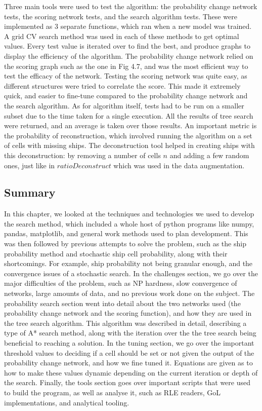 \documentclass{l4proj}
\begin{document}
Three main tools were used to test the algorithm: the probability change network tests, the scoring network tests, and the search algorithm tests. These were implemented as 3 separate functions, which ran when a new model was trained. A grid CV search method was used in each of these methods to get optimal values. Every test value is iterated over to find the best, and produce graphs to display the efficiency of the algorithm. The probability change network relied on the scoring graph such as the one in Fig 4.7, and was the most efficient way to test the efficacy of the network. Testing the scoring network was quite easy, as different structures were tried to correlate the score. This made it extremely quick, and easier to fine-tune compared to the probability change network and the search algorithm. As for algorithm itself, tests had to be run on a smaller subset due to the time taken for a single execution. All the results of tree search were returned, and an average is taken over those results. An important metric is the probability of reconstruction, which involved running the algorithm on a set of cells with missing ships. The deconstruction tool helped in creating ships with this deconstruction: by removing a number of cells $n$ and adding a few random ones, just like in $ratioDeconstruct$ which was used in the data augmentation.


\subsection{Summary}

In this chapter, we looked at the techniques and technologies we used to develop the search method, which included a whole host of python programs like numpy, pandas, matplotlib, and general work methods used to plan development. This was then followed by previous attempts to solve the problem, such as the ship probability method and stochastic ship cell probability, along with their shortcomings. For example, ship probability not being granular enough, and the convergence issues of a stochastic search. In the challenges section, we go over the major difficulties of the problem, such as NP hardness, slow convergence of networks, large amounts of data, and no previous work done on the subject. The probability search section went into detail about the two networks used (the probability change network and the scoring function), and how they are used in the tree search algorithm. This algorithm was described in detail, describing a type of A* search method, along with the iteration over the the tree search being beneficial to reaching a solution. In the tuning section, we go over the important threshold values to deciding if a cell should be set or not given the output of the probability change network, and how we fine tuned it. Equations are given as to how to make these values dynamic depending on the current iteration or depth of the search. Finally, the tools section goes over important scripts that were used to build the program, as well as analyse it, such as RLE readers, GoL implementations, and analytical tooling.
\end{document}
